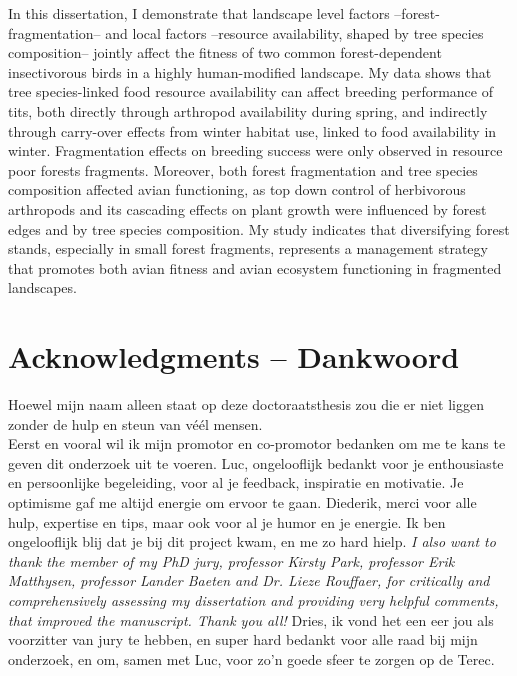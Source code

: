 \documentclass[10pt, twoside]{book} %
\renewcommand{\chaptermark}[1]{\markboth{#1}{}}
\begin{document}
In this dissertation, I demonstrate that landscape level factors --forest-fragmentation-- and local factors --resource availability, shaped by tree species composition-- jointly affect the fitness of two common forest-dependent insectivorous birds in a highly human-modified landscape. My data shows that tree species-linked food resource availability can affect breeding performance of tits, both directly through arthropod availability during spring, and indirectly through carry-over effects from winter habitat use, linked to food availability in winter. Fragmentation effects on breeding success were only observed in resource poor forests fragments. Moreover, both forest fragmentation and tree species composition affected avian functioning, as top down control of herbivorous arthropods and its cascading effects on plant growth were influenced by forest edges and by tree species composition. My study indicates that diversifying forest stands, especially in small forest fragments, represents a management strategy that promotes both avian fitness and avian ecosystem functioning in fragmented landscapes.\\

                        
\clearpage
	
	\chapter*{Acknowledgments -- Dankwoord}
	\pagestyle{mainmatter}
	\chaptermark{Acknowledgments -- Dankwoord}
	\label{Acknowledgments}
	
Hoewel mijn naam alleen staat op deze doctoraatsthesis zou die er niet liggen zonder de hulp en steun van v\'{e}\'{e}l mensen.\\

Eerst en vooral wil ik mijn promotor en co-promotor bedanken om me te kans te geven dit onderzoek uit te voeren. Luc, ongelooflijk bedankt voor je enthousiaste en persoonlijke begeleiding, voor al je feedback, inspiratie en motivatie. Je optimisme gaf me altijd energie om ervoor te gaan. Diederik, merci voor alle hulp, expertise en tips, maar ook voor al je humor en je energie. Ik ben ongelooflijk blij dat je bij dit project kwam, en me zo hard hielp. \textit{I also want to thank the member of my PhD jury, professor Kirsty Park, professor Erik Matthysen, professor Lander Baeten and Dr. Lieze Rouffaer, for critically and comprehensively assessing my dissertation and providing very helpful comments, that improved the manuscript. Thank you all!} Dries, ik vond het een eer jou als voorzitter van jury te hebben, en super hard bedankt voor alle raad bij mijn onderzoek, en om, samen met Luc, voor zo'n goede sfeer te zorgen op de Terec.\\
\end{document}

